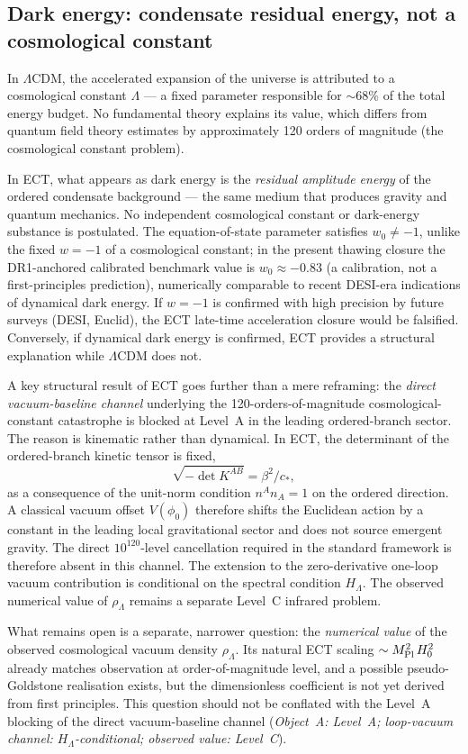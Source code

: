 \documentclass[11pt,a4paper]{article}
\begin{document}
\subsection{Dark energy: condensate residual energy, not a cosmological constant}

In $\Lambda$CDM, the accelerated expansion of the universe is attributed to a cosmological constant $\Lambda$ --- a fixed parameter responsible for $\sim 68\%$ of the total energy budget. No fundamental theory explains its value, which differs from quantum field theory estimates by approximately 120 orders of magnitude (the cosmological constant problem).

In ECT, what appears as dark energy is the \emph{residual amplitude energy} of the ordered condensate background --- the same medium that produces gravity and quantum mechanics. No independent cosmological constant or dark-energy substance is postulated. The equation-of-state parameter satisfies $w_0 \neq -1$, unlike the fixed $w = -1$ of a cosmological constant; in the present thawing closure the DR1-anchored calibrated benchmark value is $w_0 \approx -0.83$ (a calibration, not a first-principles prediction), numerically comparable to recent DESI-era indications of dynamical dark energy. If $w = -1$ is confirmed with high precision by future surveys (DESI, Euclid), the ECT late-time acceleration closure would be falsified. Conversely, if dynamical dark energy is confirmed, ECT provides a structural explanation while $\Lambda$CDM does not.

A key structural result of ECT goes further than a mere reframing: the \emph{direct vacuum-baseline channel} underlying the 120-orders-of-magnitude cosmological-constant catastrophe is blocked at Level~A in the leading ordered-branch sector. The reason is kinematic rather than dynamical. In ECT, the determinant of the ordered-branch kinetic tensor is fixed,
\[
\sqrt{-\det K^{AB}}=\beta^2/c_*,
\]
as a consequence of the unit-norm condition $n^A n_A=1$ on the ordered direction. A classical vacuum offset $V(\phi_0)$ therefore shifts the Euclidean action by a constant in the leading local gravitational sector and does not source emergent gravity. The direct $10^{120}$-level cancellation required in the standard framework is therefore absent in this channel. The extension to the zero-derivative one-loop vacuum contribution is conditional on the spectral condition $H_\Lambda$. The observed numerical value of $\rho_\Lambda$ remains a separate Level~C infrared problem.

What remains open is a separate, narrower question: the \emph{numerical value} of the observed cosmological vacuum density $\rho_\Lambda$. Its natural ECT scaling $\sim M_{\rm Pl}^2\,H_0^2$ already matches observation at order-of-magnitude level, and a possible pseudo-Goldstone realisation exists, but the dimensionless coefficient is not yet derived from first principles. This question should not be conflated with the Level~A blocking of the direct vacuum-baseline channel (\emph{Object~A: Level~A; loop-vacuum channel: $H_\Lambda$-conditional; observed value: Level~C}).
\end{document}
